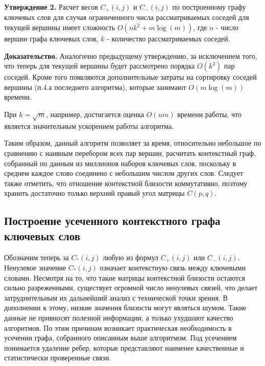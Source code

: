 \textbf{Утверждение 2.} Расчет весов $C_{+}(i, j)$ и $C_{-}(i, j)$ по построенному графу ключевых слов для случая ограниченного числа рассматриваемых соседей для текущей вершины имеет сложность $O(nk^2+m\log(m))$, где $n$ - число вершин графа ключевых слов, $k$ - количество рассматриваемых соседей.

\textbf{Доказательство.} Аналогично предыдущему утверждению, за исключением того, что теперь для текущей вершины будет рассмотрено порядка $O(k^2)$ пар соседей. Кроме того появляются дополнительные затраты на сортировку соседей вершины (п.4.а последнего алгоритма), которые занимают $O(m\log(m))$ времени. 

При $k=\sqrt{m}$, например, достигается оценка $O(nm)$ времени работы, что является значительным ускорением работы алгоритма.

Таким образом, данный алгоритм позволяет за время, относительно небольшое по сравнению с наивным перебором всех пар вершин, расчитать контекстный граф, собранный по данным из миллионов наборов ключевых слов, поскольку в среднем каждое слово соединено с небольшим числом других слов. Следует также отметить, что отношение контекстной близости коммутативно, поэтому хранить достаточно только верхний правый угол матрицы $C(p,q)$.

\subsection{Построение усеченного контекстного графа ключевых слов}
Обозначим теперь за $C_{*}(i,j)$ любую из формул $C_{+}(i,j)$ или $C_{-}(i,j)$. Ненулевое значение $C_{*}(i,j)$ означает контекстную связь между ключевыми словами. Несмотря на то, что такие матрицы контекстной близости остаются сильно разреженными, существует огромной число ненулевых связей, что делает затруднительным их дальнейший анализ с технической точки зрения. В дополнении к этому, низкие значения близости могут являться шумом. Такие данные не привносят полезной информации, а только ухудшают качество алгоритмов. По этим причинам возникает практическая необходимость в усечении графа, собранного описанным выше алгоритмом. Под усечением понимается удаление ребер, которые представляют наименее качественные и статистически проверенные связи. 

